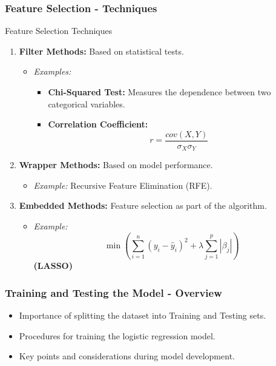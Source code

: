 \documentclass[aspectratio=169]{beamer}
\begin{document}
\begin{frame}[fragile]
  \frametitle{Feature Selection - Techniques}
  \begin{block}{Feature Selection Techniques}
    \begin{enumerate}
      \item \textbf{Filter Methods:} Based on statistical tests.
      \begin{itemize}
        \item \textit{Examples:}
        \begin{itemize}
          \item \textbf{Chi-Squared Test:} Measures the dependence between two categorical variables.
          \item \textbf{Correlation Coefficient:} 
          \begin{equation}
          r = \frac{cov(X, Y)}{\sigma_X \sigma_Y}
          \end{equation}
        \end{itemize}
      \end{itemize}

      \item \textbf{Wrapper Methods:} Based on model performance.
      \begin{itemize}
        \item \textit{Example:} Recursive Feature Elimination (RFE).
      \end{itemize}

      \item \textbf{Embedded Methods:} Feature selection as part of the algorithm.
      \begin{itemize}
        \item \textit{Example:} 
        \begin{equation}
        \min \left( \sum_{i=1}^{n} (y_i - \hat{y}_i)^2 + \lambda \sum_{j=1}^{p} | \beta_j | \right)
        \end{equation}
        \textbf{(LASSO)}
      \end{itemize}
    \end{enumerate}
  \end{block}
\end{frame}

\begin{frame}[fragile]
    \frametitle{Training and Testing the Model - Overview}
    \begin{itemize}
        \item Importance of splitting the dataset into Training and Testing sets.
        \item Procedures for training the logistic regression model.
        \item Key points and considerations during model development.
    \end{itemize}
\end{frame}
\end{document}
